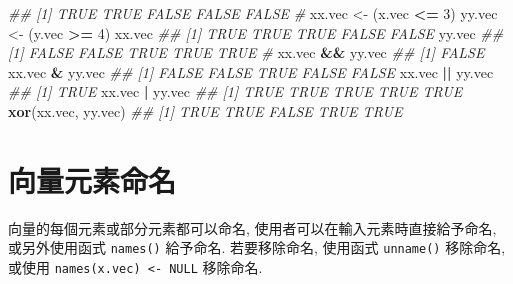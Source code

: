 \documentclass[
]{book}
\newenvironment{Shaded}{\begin{snugshade}}{\end{snugshade}}
\newcommand{\CommentTok}[1]{\textcolor[rgb]{0.56,0.35,0.01}{\textit{#1}}}
\newcommand{\DecValTok}[1]{\textcolor[rgb]{0.00,0.00,0.81}{#1}}
\newcommand{\KeywordTok}[1]{\textcolor[rgb]{0.13,0.29,0.53}{\textbf{#1}}}
\newcommand{\NormalTok}[1]{#1}
\newcommand{\OperatorTok}[1]{\textcolor[rgb]{0.81,0.36,0.00}{\textbf{#1}}}
\newcommand{\StringTok}[1]{\textcolor[rgb]{0.31,0.60,0.02}{#1}}
\begin{document}
\begin{Shaded}
\begin{Highlighting}[]
\CommentTok{\#\# [1]  TRUE  TRUE FALSE FALSE FALSE}
\CommentTok{\#}
\NormalTok{xx.vec \textless{}{-}}\StringTok{ }\NormalTok{(x.vec }\OperatorTok{\textless{}=}\StringTok{ }\DecValTok{3}\NormalTok{)}
\NormalTok{yy.vec \textless{}{-}}\StringTok{ }\NormalTok{(y.vec }\OperatorTok{\textgreater{}=}\StringTok{ }\DecValTok{4}\NormalTok{)}
\NormalTok{xx.vec}
\CommentTok{\#\# [1]  TRUE  TRUE  TRUE FALSE FALSE}
\NormalTok{yy.vec}
\CommentTok{\#\# [1] FALSE FALSE  TRUE  TRUE  TRUE}
\CommentTok{\#}
\NormalTok{xx.vec }\OperatorTok{\&\&}\StringTok{ }\NormalTok{yy.vec}
\CommentTok{\#\# [1] FALSE}
\NormalTok{xx.vec }\OperatorTok{\&}\StringTok{ }\NormalTok{yy.vec}
\CommentTok{\#\# [1] FALSE FALSE  TRUE FALSE FALSE}
\NormalTok{xx.vec }\OperatorTok{||}\StringTok{ }\NormalTok{yy.vec}
\CommentTok{\#\# [1] TRUE}
\NormalTok{xx.vec }\OperatorTok{|}\StringTok{ }\NormalTok{yy.vec}
\CommentTok{\#\# [1] TRUE TRUE TRUE TRUE TRUE}
\KeywordTok{xor}\NormalTok{(xx.vec, yy.vec)}
\CommentTok{\#\# [1]  TRUE  TRUE FALSE  TRUE  TRUE}
\end{Highlighting}
\end{Shaded}

\hypertarget{ux5411ux91cfux5143ux7d20ux547dux540d}{%
\section{向量元素命名}\label{ux5411ux91cfux5143ux7d20ux547dux540d}}

向量的每個元素或部分元素都可以命名,
使用者可以在輸入元素時直接給予命名,
或另外使用函式
\texttt{names()}
給予命名.
若要移除命名,
使用函式 \texttt{unname()} 移除命名,
或使用 \texttt{names(x.vec)\ \textless{}-\ NULL} 移除命名.
\end{document}

